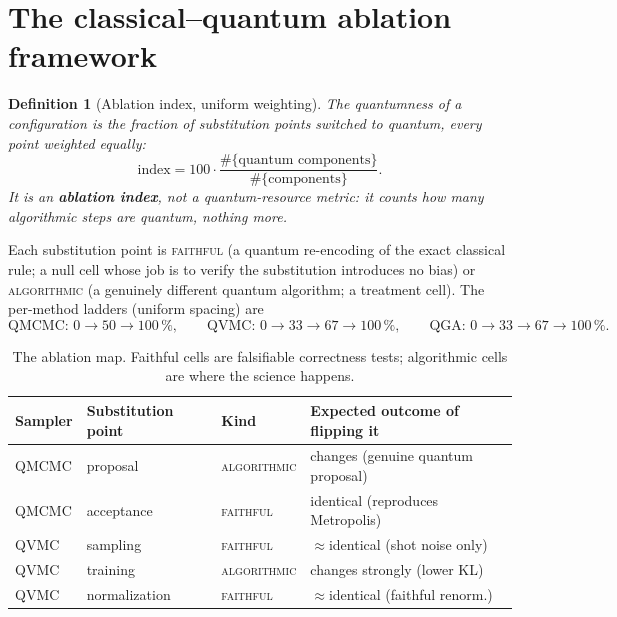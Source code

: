 \documentclass[11pt]{article}
\newtheorem{definition}{Definition}[section]
\newcommand{\faithful}{\textsc{faithful}}
\newcommand{\algorithmic}{\textsc{algorithmic}}
\begin{document}
\section{The classical--quantum ablation framework}
\label{sec:ablation}

\begin{definition}[Ablation index, uniform weighting]
The \emph{quantumness} of a configuration is the fraction of substitution
points switched to quantum, every point weighted equally:
\begin{equation}
\text{index} = 100\cdot\frac{\#\{\text{quantum components}\}}{\#\{\text{components}\}}.
\end{equation}
It is an \textbf{ablation index}, not a quantum-resource metric: it counts how
many algorithmic steps are quantum, nothing more.
\end{definition}

Each substitution point is \faithful{} (a quantum re-encoding of the exact
classical rule; a null cell whose job is to verify the substitution introduces
no bias) or \algorithmic{} (a genuinely different quantum algorithm; a
treatment cell). The per-method ladders (uniform spacing) are
\[
\text{QMCMC: } 0\to50\to100\,\%,\qquad
\text{QVMC: } 0\to33\to67\to100\,\%,\qquad
\text{QGA: } 0\to33\to67\to100\,\%.
\]

\begin{table}[h]
\centering\footnotesize
\begin{tabular}{@{}llll@{}}
\toprule
Sampler & Substitution point & Kind & Expected outcome of flipping it\\
\midrule
QMCMC & proposal      & \algorithmic & changes (genuine quantum proposal)\\
QMCMC & acceptance    & \faithful    & identical (reproduces Metropolis)\\
QVMC  & sampling      & \faithful    & $\approx$identical (shot noise only)\\
QVMC  & training      & \algorithmic & changes strongly (lower KL)\\
QVMC  & normalization & \faithful    & $\approx$identical (faithful renorm.)\\
\bottomrule
\end{tabular}
\caption{The ablation map. Faithful cells are falsifiable correctness tests;
algorithmic cells are where the science happens.}
\end{table}
\end{document}

